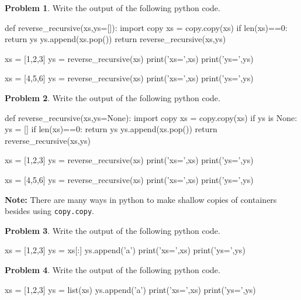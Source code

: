 \documentclass[12pt]{article}
\theoremstyle{definition}
\newtheorem{problem}{Problem}
\begin{document}
\begin{problem}
Write the output of the following python code.
\begin{python}
def reverse_recursive(xs,ys=[]):
    import copy
    xs = copy.copy(xs)
    if len(xs)==0:
        return ys
    ys.append(xs.pop())
    return reverse_recursive(xs,ys)

xs = [1,2,3]
ys = reverse_recursive(xs)
print('xs=',xs)
print('ys=',ys)

xs = [4,5,6]
ys = reverse_recursive(xs)
print('xs=',xs)
print('ys=',ys)
\end{python}
\end{problem}
\vspace{2in}

\newpage

\begin{problem}
Write the output of the following python code.
\begin{python}
def reverse_recursive(xs,ys=None):
    import copy
    xs = copy.copy(xs)
    if ys is None:
        ys = []
    if len(xs)==0:
        return ys
    ys.append(xs.pop())
    return reverse_recursive(xs,ys)

xs = [1,2,3]
ys = reverse_recursive(xs)
print('xs=',xs)
print('ys=',ys)

xs = [4,5,6]
ys = reverse_recursive(xs)
print('xs=',xs)
print('ys=',ys)
\end{python}
\end{problem}
\vspace{2in}


\newpage
\noindent
\textbf{Note:}
There are many ways in python to make shallow copies of containers besides using \texttt{copy.copy}.

\begin{problem}
Write the output of the following python code.
\begin{python}
xs = [1,2,3]
ys = xs[:]
ys.append('a')
print('xs=',xs)
print('ys=',ys)
\end{python}
\end{problem}
\vspace{2in}

\begin{problem}
Write the output of the following python code.
\begin{python}
xs = [1,2,3]
ys = list(xs)
ys.append('a')
print('xs=',xs)
print('ys=',ys)
\end{python}
\end{problem}
\vspace{2in}
\end{document}
